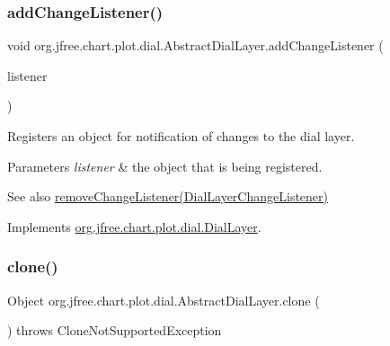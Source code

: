 \subsubsection{\texorpdfstring{add\+Change\+Listener()}{addChangeListener()}}
{\footnotesize\ttfamily void org.\+jfree.\+chart.\+plot.\+dial.\+Abstract\+Dial\+Layer.\+add\+Change\+Listener (\begin{DoxyParamCaption}\item[{\mbox{\hyperlink{interfaceorg_1_1jfree_1_1chart_1_1plot_1_1dial_1_1_dial_layer_change_listener}{Dial\+Layer\+Change\+Listener}}}]{listener }\end{DoxyParamCaption})}

Registers an object for notification of changes to the dial layer.


\begin{DoxyParams}{Parameters}
{\em listener} & the object that is being registered.\\
\hline
\end{DoxyParams}
\begin{DoxySeeAlso}{See also}
\mbox{\hyperlink{classorg_1_1jfree_1_1chart_1_1plot_1_1dial_1_1_abstract_dial_layer_a584dfebd9266b2be68b75916812a3b8f}{remove\+Change\+Listener(\+Dial\+Layer\+Change\+Listener)}} 
\end{DoxySeeAlso}


Implements \mbox{\hyperlink{interfaceorg_1_1jfree_1_1chart_1_1plot_1_1dial_1_1_dial_layer_a6a2e5bdf252099b17e57f3685db6e2e4}{org.\+jfree.\+chart.\+plot.\+dial.\+Dial\+Layer}}.

\mbox{\label{classorg_1_1jfree_1_1chart_1_1plot_1_1dial_1_1_abstract_dial_layer_a29be7ba6877313aea93b9d62745cebe6}} 
\subsubsection{\texorpdfstring{clone()}{clone()}}
{\footnotesize\ttfamily Object org.\+jfree.\+chart.\+plot.\+dial.\+Abstract\+Dial\+Layer.\+clone (\begin{DoxyParamCaption}{ }\end{DoxyParamCaption}) throws Clone\+Not\+Supported\+Exception}

